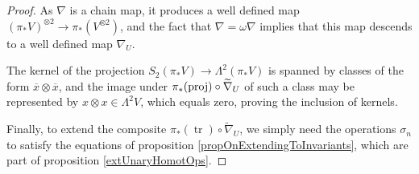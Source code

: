 \documentclass[11pt]{amsart}
\theoremstyle{plain}
\theoremstyle{definition}
\DeclareMathOperator{\trace}{tr}
\newcommand{\DASH}{\textup{--}}
\renewcommand{\to}{\longrightarrow}
\newcommand{\calV}{\mathcal{V}}
\theoremstyle{plain}
\newcommand{\restn}[1]{#1^{[2]}}
\newcommand{\vect}[2]{\calV^{#1}_{#2}}
\newcommand{\twist}{\omega}
\begin{document}
\begin{Constructing homotopy and cohomotopy operations}
\begin{proof}
As $\nabla$ is a chain  map, it produces a well defined map $(\pi_*V)^{\otimes2}\to \pi_*(V^{\otimes2})$, and the fact that $\nabla=\twist\nabla$ implies that this map descends to a well defined map $\nabla_U$.

The kernel of the projection $S_2(\pi_*V)\to \Lambda^2(\pi_*V)$ is spanned by classes of the form $\overline{x}\otimes \overline{x}$, and the image under $\pi_*(\textup{proj})\circ\widetilde{\nabla}_U$ of such a class may be represented by $x\otimes x\in \Lambda^2V$, which equals zero, proving the inclusion of kernels.

Finally, to extend the composite $\pi_*(\trace)\circ\widetilde{\nabla}_U$, we simply need the operations $\sigma_n$ to satisfy the equations of proposition \ref{propOnExtendingToInvariants}, which are part of proposition \ref{extUnaryHomotOps}.
%
%
%
%
%
\end{proof}


\end{Constructing homotopy and cohomotopy operations}
\end{document}
